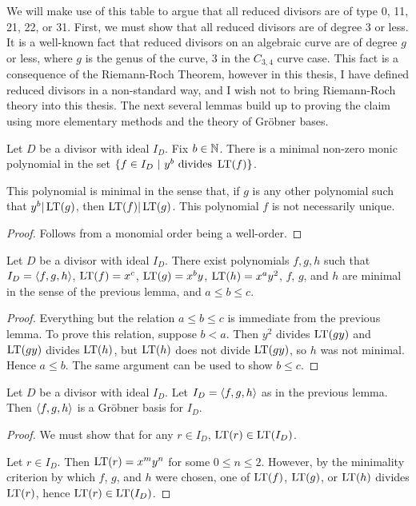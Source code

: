 We will make use of this table to argue that all reduced divisors are of type 0, 11, 21, 22, or 31.
First, we must show that all reduced divisors are of degree 3 or less.
It is a well-known fact that reduced divisors on an algebraic curve are of degree $g$ or less,
where $g$ is the genus of the curve, 3 in the $C_{3,4}$ curve case.
This fact is a consequence of the Riemann-Roch Theorem,
however in this thesis, I have defined reduced divisors in a non-standard way,
and I wish not to bring Riemann-Roch theory into this thesis.
The next several lemmas build up to proving the claim using more elementary methods
and the theory of Gr\"obner bases.

\begin{lemma}
  Let $D$ be a divisor with ideal $I_D$.
  Fix $b \in \mathbb{N}$.
  There is a minimal non-zero monic polynomial in the set $\{ f \in I_D ~|~ y^b \text{ divides } \operatorname{LT}(f)\}$.
\end{lemma}
This polynomial is minimal in the sense that, if $g$ is any other polynomial such that $y^b|\operatorname{LT}(g)$,
then $\operatorname{LT}(f)|\operatorname{LT}(g)$.
This polynomial $f$ is not necessarily unique.
\begin{proof}
  Follows from a monomial order being a well-order.
\end{proof}

\begin{lemma}
  Let $D$ be a divisor with ideal $I_D$.
  There exist polynomials $f, g, h$ such that $I_D = \left\langle f, g, h \right\rangle$,
  $\operatorname{LT}(f) = x^c$,
  $\operatorname{LT}(g) = x^by$,
  $\operatorname{LT}(h) = x^ay^2$,
  $f$, $g$, and $h$ are minimal in the sense of the previous lemma,
  and $a \leq b \leq c$.
\end{lemma}
\begin{proof}
  Everything but the relation $a \leq b \leq c$ is immediate from the previous lemma.
  To prove this relation, suppose $b < a$.
  Then $y^2$ divides $\operatorname{LT}(gy)$ and $\operatorname{LT}(gy)$ divides $\operatorname{LT}(h)$, but $\operatorname{LT}(h)$ does not divide $\operatorname{LT}(gy)$,
  so $h$ was not minimal. Hence $a \leq b$.
  The same argument can be used to show $b \leq c$.
\end{proof}

\begin{lemma}
  Let $D$ be a divisor with ideal $I_D$.
  Let $I_D = \left\langle f, g, h \right\rangle$ as in the previous lemma.
  Then $\left\langle f, g, h \right\rangle$ is a Gr\"obner basis for $I_D$.
\end{lemma}
\begin{proof}
  We must show that for any $r \in I_D$, $\operatorname{LT}(r) \in \operatorname{LT}(I_D)$.
  
  Let $r \in I_D$. Then $\operatorname{LT}(r) = x^my^n$ for some $0 \leq n \leq 2$.
  However, by the minimality criterion by which $f$, $g$, and $h$ were chosen,
  one of $\operatorname{LT}(f)$, $\operatorname{LT}(g)$, or $\operatorname{LT}(h)$ divides $\operatorname{LT}(r)$, hence $\operatorname{LT}(r) \in \operatorname{LT}(I_D)$.
\end{proof}

